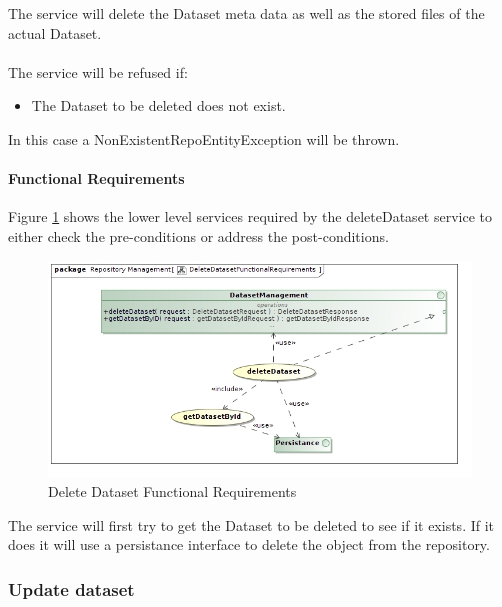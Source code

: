  The service will delete the Dataset meta data as well as the stored files
 of the actual Dataset.\\\\
 The service will be refused if:\\
	 \begin{itemize}
	 	\item The Dataset to be deleted does not exist.
	 \end{itemize}
In this case a NonExistentRepoEntityException will be thrown.

\paragraph{Functional Requirements}
Figure \ref{fig:deleteAlgorithmFuncReq} shows the lower level services required
by the deleteDataset service to either check the pre-conditions or address the
post-conditions.

\begin{figure}[H]
  \begin{center}
  \includegraphics[scale=0.5]{../Diagrams and Charts/Test Data/DeleteDatasetFunctionalRequirements.jpg}
  \caption{Delete Dataset Functional Requirements}
  \label{fig:deleteAlgorithmFuncReq}
  \end{center}  
 \end{figure}

 The service will first try to get the Dataset to be deleted to see if it
 exists. If it does it will use a persistance interface to delete the object
 from the repository.
\subsubsection {Update dataset}

